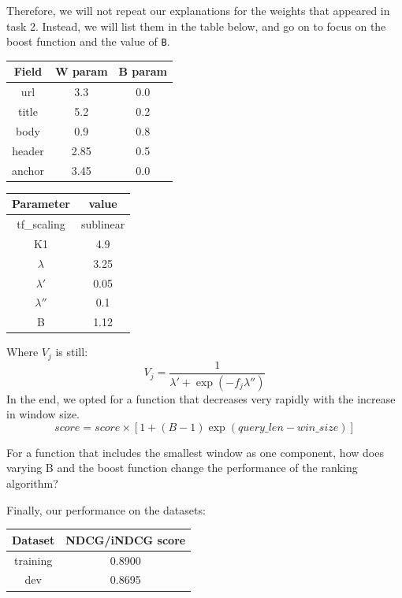 \documentclass[10pt,twocolumn]{article}
\begin{document}
Therefore, we will not repeat our explanations for the weights that appeared in task 2. Instead, we will list them in the table below, and go on to focus on the boost function and the value of \texttt{B}.
\begin{table}[H]
\centering
\begin{tabular}{|c|c|c|}
\hline
Field & W param & B param\\\hline
url & 3.3 & 0.0\\\hline
title & 5.2 & 0.2\\\hline
body & 0.9 & 0.8\\\hline
header & 2.85 & 0.5 \\\hline
anchor & 3.45 & 0.0\\\hline
\end{tabular}
\end{table}
\begin{table}[H]
\centering
\begin{tabular}{|c|c|}
\hline
Parameter & value\\\hline
tf\_scaling & sublinear\\\hline
K1 & 4.9\\\hline
$\lambda$ & 3.25\\\hline
$\lambda'$ & 0.05\\\hline
$\lambda''$ & 0.1\\\hline
B & 1.12\\\hline
\end{tabular}
\end{table}
Where $V_j$ is still:
\begin{equation*}
V_j = \frac{1}{\lambda'+\exp({-f_j\lambda''})}
\end{equation*}
In the end, we opted for a function that decreases very rapidly with the increase in window size.
\begin{equation*}
score = score \times [1+(B-1)\exp(query\_len-win\_size)]
\end{equation*}


For a function that includes the smallest window as one component,
how does varying B and the boost function change the performance
of the ranking algorithm?

Finally, our performance on the datasets:
\begin{table}[H]
\centering
\begin{tabular}{|c|c|}
\hline
Dataset & NDCG/iNDCG score \\\hline
training & 0.8900\\\hline
dev & 0.8695\\\hline
\end{tabular}
\end{table}
\end{document}
